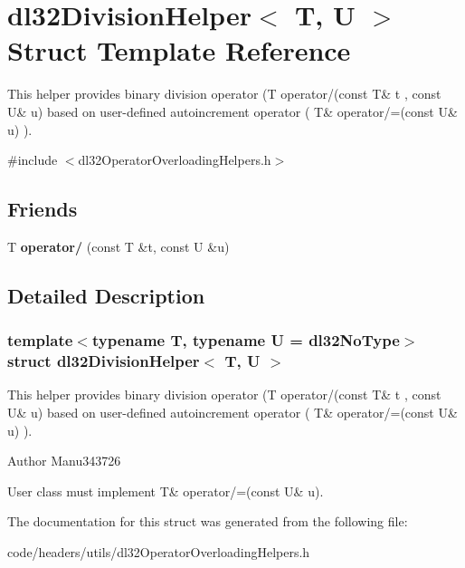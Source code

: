 \hypertarget{structdl32_division_helper}{\section{dl32\-Division\-Helper$<$ T, U $>$ Struct Template Reference}
\label{structdl32_division_helper}
}


This helper provides binary division operator (T operator/(const T\& t , const U\& u) based on user-\/defined autoincrement operator ( T\& operator/=(const U\& u) ).  




{\ttfamily \#include $<$dl32\-Operator\-Overloading\-Helpers.\-h$>$}

\subsection*{Friends}
\begin{DoxyCompactItemize}
\item 
\hypertarget{structdl32_division_helper_a2405804b1520a61d79cfd949daaacf81}{T {\bfseries operator/} (const T \&t, const U \&u)}\label{structdl32_division_helper_a2405804b1520a61d79cfd949daaacf81}

\end{DoxyCompactItemize}


\subsection{Detailed Description}
\subsubsection*{template$<$typename T, typename U = dl32\-No\-Type$>$struct dl32\-Division\-Helper$<$ T, U $>$}

This helper provides binary division operator (T operator/(const T\& t , const U\& u) based on user-\/defined autoincrement operator ( T\& operator/=(const U\& u) ). 

\begin{DoxyAuthor}{Author}
Manu343726
\end{DoxyAuthor}
User class must implement T\& operator/=(const U\& u). 

The documentation for this struct was generated from the following file\-:\begin{DoxyCompactItemize}
\item 
code/headers/utils/dl32\-Operator\-Overloading\-Helpers.\-h\end{DoxyCompactItemize}
